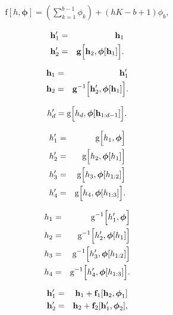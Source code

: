 \documentclass[letterpaper,twoside,openany, titlepage,oldfontcommands,titles,dvipsnames]{memoir}
\begin{document}
\begin{eqnarray}\label{eq:flow_elementwise}
 \mbox{f}[h,\boldsymbol\phi] = \left(\sum_{k=1}^{b-1}\phi_{k}\right)+ (hK-b+1)\phi_{b},
 \end{eqnarray}

\begin{eqnarray}
 \mathbf{h}'_{1}&=& \mathbf{h}_{1}\nonumber \\
 \mathbf{h}'_{2} &=& \mbox{\bf g}\Bigl[\mathbf{h}_{2},\boldsymbol\phi[\mathbf{h}_{1}]\Bigr].
 \end{eqnarray}

\begin{eqnarray}
 \mathbf{h}_{1}&=& \mathbf{h}'_{1}\nonumber \\
 \mathbf{h}_{2}&=& \mbox{\bf g}^{-1}\Bigl[\mathbf{h}'_{2},\boldsymbol\phi[\mathbf{h}_{1}]\Bigr].
 \end{eqnarray}

\begin{eqnarray}
 h'_{d} = \mbox{g}\Bigl[h_{d},\boldsymbol\phi[\mathbf{h}_{1:d-1}]\Bigr].
 \end{eqnarray}

\begin{eqnarray}
 h'_{1} &=& \mbox{g}\Bigl[h_{1},\boldsymbol\phi\Bigr]\nonumber \\
 h'_{2} &=& \mbox{g}\Bigl[h_{2},\boldsymbol\phi[h_{1}]\Bigr]\nonumber \\
 h'_{3} &=& \mbox{g}\Bigl[h_{3},\boldsymbol\phi[h_{1:2}]\Bigr]\nonumber \\
 h'_{4} &=& \mbox{g}\Bigl[h_{4},\boldsymbol\phi[h_{1:3}]\Bigr].
 \end{eqnarray}

\begin{eqnarray}
 h_{1} &=& \mbox{g}^{-1}\Bigl[h'_{1},\boldsymbol\phi\Bigr]\nonumber \\
 h_{2} &=& \mbox{g}^{-1}\Bigl[h'_{2},\boldsymbol\phi[h_{1}]\Bigr]\nonumber \\
 h_{3} &=& \mbox{g}^{-1}\Bigl[h'_{3},\boldsymbol\phi[h_{1:2}]\Bigr]\nonumber \\
 h_{4} &=& \mbox{g}^{-1}\Bigl[h'_{4},\boldsymbol\phi[h_{1:3}]\Bigr].
 \end{eqnarray}

\begin{eqnarray}
  \mathbf{h}'_{1} &=& \mathbf{h}_{1}+ \mbox{\bf f}_{1}[\mathbf{h}_{2},\boldsymbol\phi_{1}]\nonumber \\
  \mathbf{h}'_{2} &=& \mathbf{h}_{2}+ \mbox{\bf f}_{2}[\mathbf{h}'_{1},\boldsymbol\phi_{2}],
 \end{eqnarray}
\end{document}
